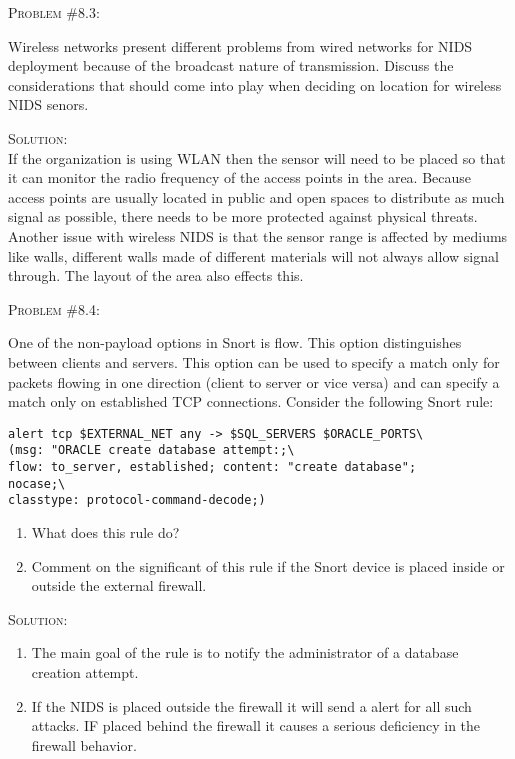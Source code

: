 \documentclass[12pt]{article}
\newenvironment{problem}[1]
{\begin{mdframed}[linewidth=0.8pt]
        \textsc{Problem #1:}

}
    {\end{mdframed}}
\newenvironment{solution}
    {\textsc{Solution:}\\}
    {\newpage}%
\begin{document}
	\begin{problem}{\#8.3}
		Wireless networks present different problems from wired networks for NIDS deployment because of the broadcast nature of transmission. Discuss the considerations that should come into play when deciding on location for wireless NIDS senors.
	\end{problem}
	\begin{solution}
		If the organization is using WLAN then the sensor will need to be placed so that it can monitor the radio frequency of the access points in the area. Because access points are usually located in public and open spaces to distribute as much signal as possible, there needs to be more protected against physical threats. Another issue with wireless NIDS is that the sensor range is affected by mediums like walls, different walls made of different materials will not always allow signal through. The layout of the area also effects this.
	\end{solution}

	\begin{problem}{\#8.4}
		One of the non-payload options in Snort is flow. This option distinguishes between clients and servers. This option can be used to specify a match only for packets flowing in one direction (client to server or vice versa) and can specify a match only on established TCP connections. Consider the following Snort rule:
		\begin{center}
		\verb|alert tcp $EXTERNAL_NET any -> $SQL_SERVERS $ORACLE_PORTS\|\\
		\verb|(msg: "ORACLE create database attempt:;\|\\
		\verb|flow: to_server, established; content: "create database";|\\
		\verb|nocase;\|\\
		\verb|classtype: protocol-command-decode;)|\\
	\end{center}
	\begin{enumerate}[label=\alph*]
			\item What does this rule do?
			\item Comment on the significant of this rule if the Snort device is placed inside or outside the external firewall.
		\end{enumerate}
	\end{problem}
	\begin{solution}
		\begin{enumerate}[label=\alph*]
			\item The main goal of the rule is to notify the administrator of a database creation attempt.
			\item If the NIDS is placed outside the firewall it will send a alert for all such attacks. IF placed behind the firewall it causes a serious deficiency in the firewall behavior.
		\end{enumerate}
	\end{solution}
\end{document}
